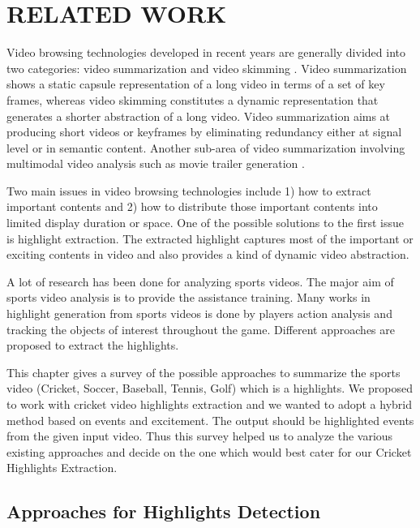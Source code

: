
\chapter{RELATED WORK} %
Video browsing technologies developed in recent years are generally divided into two categories: video summarization \cite{1038180,1246738,609414} and video skimming \cite{609414}. Video summarization shows a static capsule representation of a long video in terms of a set of key frames, whereas video skimming constitutes a dynamic representation that generates a shorter abstraction of a long video. Video summarization \cite{Ma:2002:UAM:641007.641116, 1640790, DBLP:journals/corr/ZhangCSG16a} aims at producing short videos or keyframes by eliminating redundancy either at signal level or in semantic content. Another sub-area of video summarization involving multimodal video analysis such as movie trailer generation \cite{6527322, Irie:2010:ATG:1873951.1874092}.

Two main issues in video browsing technologies include 1) how to extract important contents and 2) how to distribute those important contents into limited display duration or space. One of the possible solutions to the first issue is highlight extraction. The extracted highlight captures most of the important or exciting contents in video and also provides a kind of dynamic video abstraction.

A lot of research has been done for analyzing sports videos\cite{8491305,7479531}. The major aim of sports video analysis is to provide the assistance training. Many works in highlight generation from sports videos is done by players action analysis and tracking the objects of interest throughout the game. Different approaches are proposed to extract the highlights.

This chapter gives a survey of the possible approaches to summarize the sports video (Cricket, Soccer, Baseball, Tennis, Golf) which is a highlights. We proposed to work with cricket video highlights extraction and we wanted to adopt a hybrid method based on events and excitement. The output should be highlighted events from the given input video. Thus this survey helped us to analyze the various existing approaches and decide on the one which would best cater for our Cricket Highlights Extraction.
\section{Approaches for Highlights Detection}
